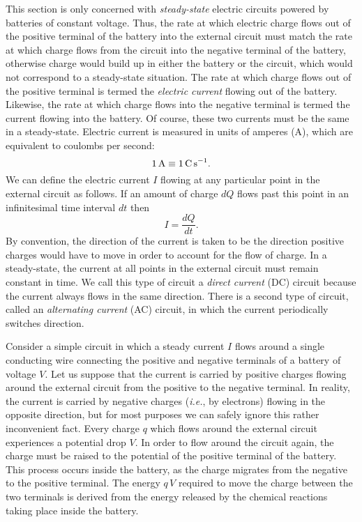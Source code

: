 This section is only concerned with {\em steady-state}\/ electric circuits
powered by batteries of constant voltage. Thus, the rate at which electric
charge flows out of the positive terminal of the battery into the external
circuit must match the rate at which charge flows from the circuit into
the negative terminal of the battery, otherwise charge would build up in
either the battery or the circuit, which would not correspond to a steady-state
situation. The rate at which charge flows out of the positive terminal
is termed the {\em electric current}\/ flowing out of the battery. Likewise,
the rate at which charge flows into the negative terminal is termed the current
flowing into the battery. Of course, these two currents must be the same in
a steady-state. 
Electric current is measured in units of amperes (A), which are
equivalent to coulombs per second:
\begin{equation}
1\,{\rm A} \equiv 1\,{\rm C \,s}^{-1}.
\end{equation}
We can define the electric current $I$ flowing at any particular point in the
external circuit as follows. If an amount of charge $dQ$ flows past this point
in an infinitesimal  time interval $dt$ then
\begin{equation}
I= \frac{d Q}{dt}.
\end{equation}
By convention, the direction of the current is taken to be the
direction positive charges would have to move in order to account for the
flow of charge.
In a steady-state, the current at all points in the external circuit must
remain constant in time. We call this type of circuit a {\em direct current}\/ (DC)
circuit because the current always flows in the same direction. There is
a second type of circuit, called an {\em alternating current}\/ (AC) circuit, in
which the current periodically switches direction. 

Consider a simple circuit in which a steady current $I$ flows 
around a single conducting wire connecting the positive and negative
terminals of a battery of voltage $V$. Let us suppose that the current is
carried by positive charges flowing around the external circuit from the positive to
the negative terminal. In reality, the current is
carried by negative charges ({\em i.e.}, by electrons) flowing in the opposite
direction, but for most purposes we can safely ignore this rather inconvenient fact.
Every charge $q$ which flows around the external circuit experiences a
potential drop $V$. In order to flow around the circuit again, the charge must
be raised  to the potential of the positive terminal
of the battery. This process occurs inside the battery, as the charge migrates from the
negative to the positive terminal. The energy $q \,V$
required to move the charge between the two terminals is derived  from the
energy released by the chemical reactions taking place inside the
battery. 

